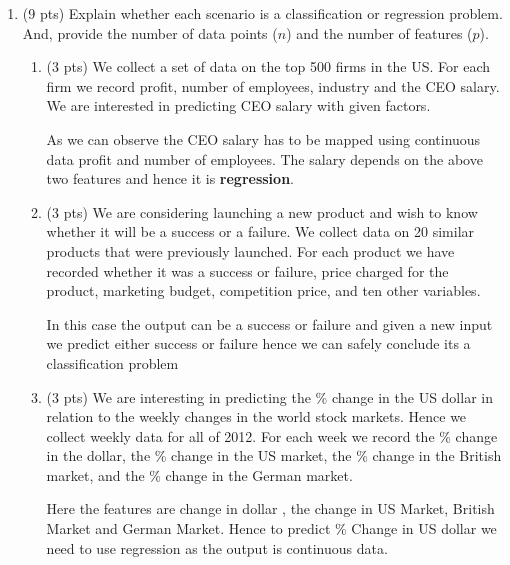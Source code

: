 \documentclass[a4paper]{article}
\theoremstyle{definition}
\newenvironment{soln}{
    \leavevmode\color{blue}\ignorespaces
}{}
\begin{document}
\begin{enumerate}
\item (9 pts) Explain whether each scenario is a classification or regression problem. And, provide the number of data points ($n$) and the number of features ($p$).

\begin{enumerate}
	\item (3 pts) We collect a set of data on the top 500 firms in the US. For each firm we record profit, number of employees, industry and the CEO salary. We are interested in predicting CEO salary with given factors.
	
	\begin{soln} As we can observe the CEO salary has to be mapped using continuous data profit and number of employees. The salary depends on the above two features and hence it is \textbf{regression}.\end{soln}
	
	\item (3 pts) We are considering launching a new product and wish to know whether it will be a success or a failure. We collect data on 20 similar products that were previously launched. For each product we have recorded whether it was a success or failure, price charged for the product, marketing budget, competition price, and ten other variables.
	
	\begin{soln}  In this case the output can be a success or failure and given a new input we predict either success or failure hence we can safely conclude its a classification problem \end{soln}
	
	\item (3 pts) We are interesting in predicting the \% change in the US dollar in relation to the weekly changes in the world stock markets. Hence we collect weekly data for all of 2012. For each week we record the \% change in the dollar, the \% change in the US market, the \% change in the British market, and the \% change in the German market.
	
	\begin{soln} Here the features are change in dollar , the change in US Market, British Market and German Market. Hence to predict \% Change in US dollar we need to use regression as the output is continuous data. \end{soln}
	
\end{enumerate}


\end{enumerate}
\end{document}
